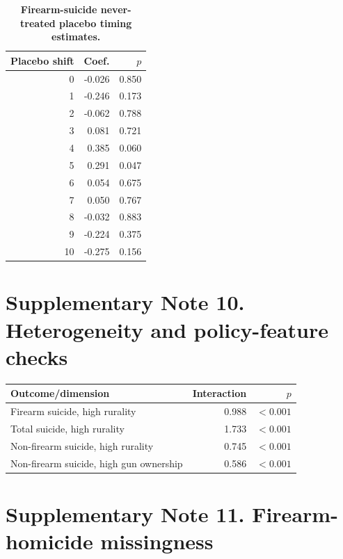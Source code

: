 \documentclass[10pt]{article}
\begin{document}
\begin{table}[H]
\centering
\caption{\textbf{Firearm-suicide never-treated placebo timing estimates.}}
\small
\begin{tabular}{rrr}
\toprule
Placebo shift & Coef. & $p$ \\
\midrule
0 & -0.026 & 0.850 \\
1 & -0.246 & 0.173 \\
2 & -0.062 & 0.788 \\
3 & 0.081 & 0.721 \\
4 & 0.385 & 0.060 \\
5 & 0.291 & 0.047 \\
6 & 0.054 & 0.675 \\
7 & 0.050 & 0.767 \\
8 & -0.032 & 0.883 \\
9 & -0.224 & 0.375 \\
10 & -0.275 & 0.156 \\
\bottomrule
\end{tabular}
\end{table}


\section*{Supplementary Note 10. Heterogeneity and policy-feature checks}


\begin{center}
\begin{tabular}{lrr}
\toprule
Outcome/dimension & Interaction & $p$ \\
\midrule
Firearm suicide, high rurality & 0.988 & $<0.001$ \\
Total suicide, high rurality & 1.733 & $<0.001$ \\
Non-firearm suicide, high rurality & 0.745 & $<0.001$ \\
Non-firearm suicide, high gun ownership & 0.586 & $<0.001$ \\
\bottomrule
\end{tabular}
\end{center}


\section*{Supplementary Note 11. Firearm-homicide missingness}





\end{document}
